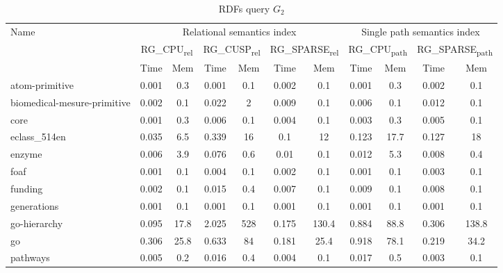 {\setlength{\tabcolsep}{0.4em}
\begin{table*}[h]
\caption{RDFs query $G_2$}
\label{tbl:tableRDFQ2}
\begin{tabular}{| l | c  c | c  c | c  c | c  c | c  c |}
    \hline

    \multirow{3}{*}{Name}   &   \multicolumn{6}{|c|}{Relational semantics index}	&	\multicolumn{4}{|c|}{Single path semantics index} \\
    \cline{2-11}
    &	\multicolumn{2}{|c|}{RG\_CPU\textsubscript{rel}}	&	\multicolumn{2}{|c|}{RG\_CUSP\textsubscript{rel}}	&	\multicolumn{2}{|c|}{RG\_SPARSE\textsubscript{rel}} &	\multicolumn{2}{|c|}{RG\_CPU\textsubscript{path}}	&	\multicolumn{2}{|c|}{RG\_SPARSE\textsubscript{path}}	 \\
    \cline{2-11}
    &   Time & Mem &  Time     & Mem & Time     & Mem  &  Time     & Mem & Time     & Mem \\
    \hline
    \hline
    atom-primitive          & 0.001 & 0.3  & 0.001 & 0.1 & 0.002 & 0.1   & 0.001 & 0.3  & 0.002 & 0.1   \\
biomedical-mesure-primitive & 0.002 & 0.1  & 0.022 & 2   & 0.009 & 0.1   & 0.006 & 0.1  & 0.012 & 0.1   \\
core                        & 0.001 & 0.3  & 0.006 & 0.1 & 0.004 & 0.1   & 0.003 & 0.3  & 0.005 & 0.1   \\
eclass\_514en               & 0.035 & 6.5  & 0.339 & 16  & 0.1   & 12    & 0.123 & 17.7 & 0.127 & 18    \\
enzyme                      & 0.006 & 3.9  & 0.076 & 0.6 & 0.01  & 0.1   & 0.012 & 5.3  & 0.008 & 0.4   \\
foaf                        & 0.001 & 0.1  & 0.004 & 0.1 & 0.002 & 0.1   & 0.001 & 0.1  & 0.003 & 0.1   \\
funding                     & 0.002 & 0.1  & 0.015 & 0.4 & 0.007 & 0.1   & 0.009 & 0.1  & 0.008 & 0.1   \\
generations                 & 0.001 & 0.1  & 0.001 & 0.1 & 0.001 & 0.1   & 0.001 & 0.1  & 0.001 & 0.1   \\
go-hierarchy                & 0.095 & 17.8 & 2.025 & 528 & 0.175 & 130.4 & 0.884 & 88.8 & 0.306 & 138.8 \\
go                          & 0.306 & 25.8 & 0.633 & 84  & 0.181 & 25.4  & 0.918 & 78.1 & 0.219 & 34.2  \\
pathways                    & 0.005 & 0.2  & 0.016 & 0.4 & 0.004 & 0.1   & 0.017 & 0.5  & 0.003 & 0.1   \\

\end{tabular}
\end{table*}}
